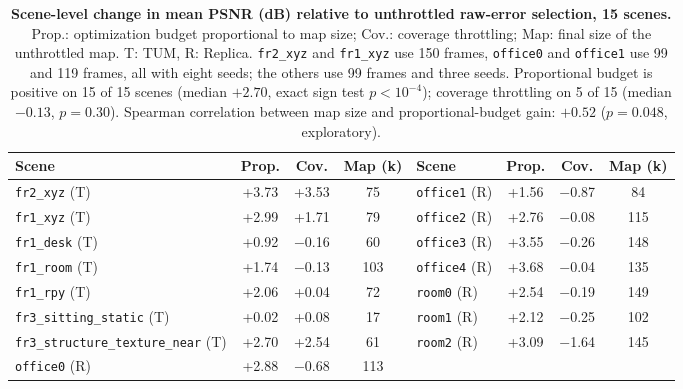 \begin{table}[t]
\centering
\footnotesize\setlength{\tabcolsep}{4pt}
\begin{tabular}{lccclccc}
\toprule
\textbf{Scene} & \textbf{Prop.} & \textbf{Cov.} & \textbf{Map (k)} & \textbf{Scene} & \textbf{Prop.} & \textbf{Cov.} & \textbf{Map (k)} \\
\midrule
\texttt{fr2\_xyz} (T) & +3.73 & +3.53 & 75 & \texttt{office1} (R) & +1.56 & $-$0.87 & 84 \\
\texttt{fr1\_xyz} (T) & +2.99 & +1.71 & 79 & \texttt{office2} (R) & +2.76 & $-$0.08 & 115 \\
\texttt{fr1\_desk} (T) & +0.92 & $-$0.16 & 60 & \texttt{office3} (R) & +3.55 & $-$0.26 & 148 \\
\texttt{fr1\_room} (T) & +1.74 & $-$0.13 & 103 & \texttt{office4} (R) & +3.68 & $-$0.04 & 135 \\
\texttt{fr1\_rpy} (T) & +2.06 & +0.04 & 72 & \texttt{room0} (R) & +2.54 & $-$0.19 & 149 \\
\texttt{fr3\_sitting\_static} (T) & +0.02 & +0.08 & 17 & \texttt{room1} (R) & +2.12 & $-$0.25 & 102 \\
\texttt{fr3\_structure\_texture\_near} (T) & +2.70 & +2.54 & 61 & \texttt{room2} (R) & +3.09 & $-$1.64 & 145 \\
\texttt{office0} (R) & +2.88 & $-$0.68 & 113 &  & & &  \\
\bottomrule
\end{tabular}
\caption{\textbf{Scene-level change in mean PSNR (dB) relative to unthrottled raw-error selection, 15 scenes.} Prop.: optimization budget proportional to map size; Cov.: coverage throttling; Map: final size of the unthrottled map. T: TUM, R: Replica. \texttt{fr2\_xyz} and \texttt{fr1\_xyz} use 150 frames, \texttt{office0} and \texttt{office1} use 99 and 119 frames, all with eight seeds; the others use 99 frames and three seeds. Proportional budget is positive on 15 of 15 scenes (median $+2.70$, exact sign test $p<10^{-4}$); coverage throttling on 5 of 15 (median $-0.13$, $p=0.30$). Spearman correlation between map size and proportional-budget gain: $+0.52$ ($p=0.048$, exploratory).}
\label{tab:scenelevel}
\end{table}
